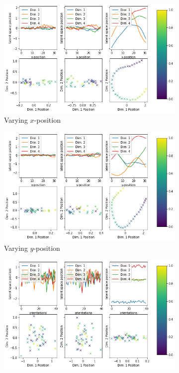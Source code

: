 \documentclass[11pt,a4paper]{article}
\begin{document}
\begin{figure}
\centering
\begin{subfigure}{.48\textwidth}
\centering
\includegraphics[width=\textwidth]{images/latent_space_traversals/vlae_gan_dsprites_left_latent_space_values.png}
\caption{Varying $x$-position}
\end{subfigure}
\hfill
\begin{subfigure}{.48\textwidth}
\centering
\includegraphics[width=\textwidth]{images/latent_space_traversals/vlae_gan_dsprites_bottom_latent_space_values.png}
\caption{Varying $y$-position}
\end{subfigure}
\vfill
\begin{subfigure}{.48\textwidth}
\centering
\includegraphics[width=\textwidth]{images/latent_space_traversals/vlae_gan_dsprites_orientation_latent_space_values.png}

\end{subfigure}
\end{figure}
\end{document}
